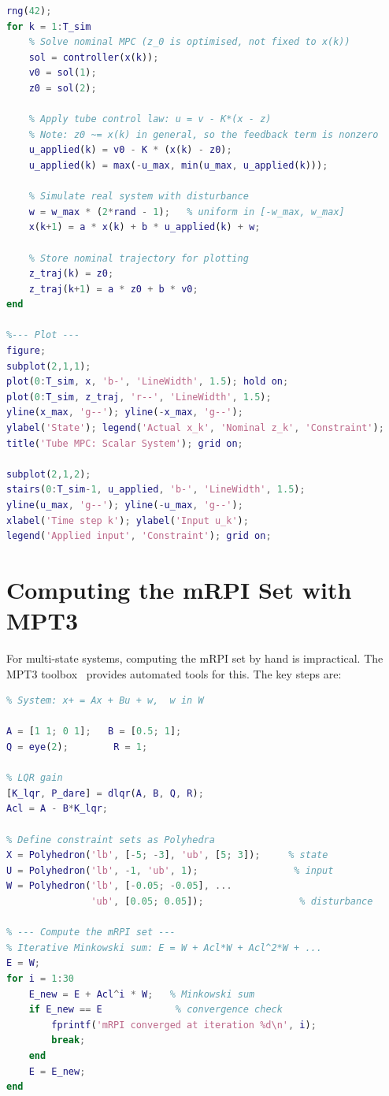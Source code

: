 \begin{lstlisting}[language=Matlab, caption={Tube MPC implementation for the scalar system}]
rng(42);
for k = 1:T_sim
    % Solve nominal MPC (z_0 is optimised, not fixed to x(k))
    sol = controller(x(k));
    v0 = sol(1);
    z0 = sol(2);

    % Apply tube control law: u = v - K*(x - z)
    % Note: z0 ~= x(k) in general, so the feedback term is nonzero
    u_applied(k) = v0 - K * (x(k) - z0);
    u_applied(k) = max(-u_max, min(u_max, u_applied(k)));

    % Simulate real system with disturbance
    w = w_max * (2*rand - 1);   % uniform in [-w_max, w_max]
    x(k+1) = a * x(k) + b * u_applied(k) + w;

    % Store nominal trajectory for plotting
    z_traj(k) = z0;
    z_traj(k+1) = a * z0 + b * v0;
end

%--- Plot ---
figure;
subplot(2,1,1);
plot(0:T_sim, x, 'b-', 'LineWidth', 1.5); hold on;
plot(0:T_sim, z_traj, 'r--', 'LineWidth', 1.5);
yline(x_max, 'g--'); yline(-x_max, 'g--');
ylabel('State'); legend('Actual x_k', 'Nominal z_k', 'Constraint');
title('Tube MPC: Scalar System'); grid on;

subplot(2,1,2);
stairs(0:T_sim-1, u_applied, 'b-', 'LineWidth', 1.5);
yline(u_max, 'g--'); yline(-u_max, 'g--');
xlabel('Time step k'); ylabel('Input u_k');
legend('Applied input', 'Constraint'); grid on;
\end{lstlisting}


\section{Computing the mRPI Set with MPT3}
\label{sec:tube_mpt3}

For multi-state systems, computing the mRPI set by hand is impractical. The MPT3 toolbox~\cite{Herceg2013} provides automated tools for this. The key steps are:

\begin{lstlisting}[language=Matlab, caption={Computing the mRPI set and tightened constraints using MPT3}]
%% Tube MPC Offline Design using MPT3
% System: x+ = Ax + Bu + w,  w in W

A = [1 1; 0 1];   B = [0.5; 1];
Q = eye(2);        R = 1;

% LQR gain
[K_lqr, P_dare] = dlqr(A, B, Q, R);
Acl = A - B*K_lqr;

% Define constraint sets as Polyhedra
X = Polyhedron('lb', [-5; -3], 'ub', [5; 3]);     % state
U = Polyhedron('lb', -1, 'ub', 1);                 % input
W = Polyhedron('lb', [-0.05; -0.05], ...
               'ub', [0.05; 0.05]);                 % disturbance

% --- Compute the mRPI set ---
% Iterative Minkowski sum: E = W + Acl*W + Acl^2*W + ...
E = W;
for i = 1:30
    E_new = E + Acl^i * W;   % Minkowski sum
    if E_new == E             % convergence check
        fprintf('mRPI converged at iteration %d\n', i);
        break;
    end
    E = E_new;
end
\end{lstlisting}

